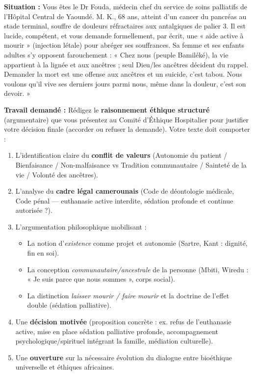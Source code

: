 \documentclass[11pt]{article}
\begin{document}
\begin{exercice}
\textbf{Situation :}
Vous êtes le Dr Fouda, médecin chef du service de soins palliatifs de l'Hôpital Central de Yaoundé. M. K., 68 ans, atteint d'un cancer du pancréas au stade terminal, souffre de douleurs réfractaires aux antalgiques de palier 3. Il est lucide, compétent, et vous demande formellement, par écrit, une « aide active à mourir » (injection létale) pour abréger ses souffrances. Sa femme et ses enfants adultes s'y opposent farouchement : « Chez nous (peuple Bamiléké), la vie appartient à la lignée et aux ancêtres ; seul Dieu/les ancêtres décident du rappel. Demander la mort est une offense aux ancêtres et un suicide, c'est tabou. Nous voulons qu'il vive ses derniers jours parmi nous, même dans la douleur, c'est son devoir. »

\vspace{0.3cm}
\noindent \textbf{Travail demandé :}
Rédigez le \textbf{raisonnement éthique structuré} (argumentaire) que vous présentez au Comité d'Éthique Hospitalier pour justifier votre décision finale (accorder ou refuser la demande). Votre texte doit comporter :
\begin{enumerate}
\item L'identification claire du \textbf{conflit de valeurs} (Autonomie du patient / Bienfaisance / Non-malfaisance vs Tradition communautaire / Sainteté de la vie / Volonté des ancêtres).
\item L'analyse du \textbf{cadre légal camerounais} (Code de déontologie médicale, Code pénal — euthanasie active interdite, sédation profonde et continue autorisée ?).
\item L'argumentation philosophique mobilisant :
\begin{itemize}
\item La notion d'\emph{existence} comme projet et autonomie (Sartre, Kant : dignité, fin en soi).
\item La conception \emph{communautaire/ancestrale} de la personne (Mbiti, Wiredu : « Je suis parce que nous sommes », corps social).
\item La distinction \emph{laisser mourir / faire mourir} et la doctrine de l'effet double (sédation palliative).
\end{itemize}
\item Une \textbf{décision motivée} (proposition concrète : ex. refus de l'euthanasie active, mise en place sédation palliative profonde, accompagnement psychologique/spirituel intégrant la famille, médiation culturelle).
\item Une \textbf{ouverture} sur la nécessaire évolution du dialogue entre bioéthique universelle et éthiques africaines.
\end{enumerate}
\end{exercice}
\end{document}
